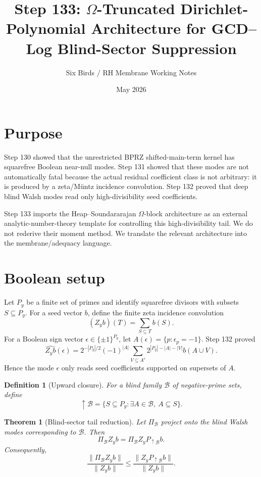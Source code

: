 \documentclass[11pt]{article}
\title{Step 133: $\Omega$-Truncated Dirichlet-Polynomial Architecture for GCD--Log Blind-Sector Suppression}
\author{Six Birds / RH Membrane Working Notes}
\date{May 2026}
\newtheorem{theorem}{Theorem}
\newtheorem{definition}{Definition}
\begin{document}
\maketitle

\section{Purpose}
Step 130 showed that the unrestricted BPRZ shifted-main-term kernel has squarefree Boolean near-null modes. Step 131 showed that these modes are not automatically fatal because the actual residual coefficient class is not arbitrary: it is produced by a zeta/Müntz incidence convolution. Step 132 proved that deep blind Walsh modes read only high-divisibility seed coefficients.

Step 133 imports the Heap--Soundararajan $\Omega$-block architecture as an external analytic-number-theory template for controlling this high-divisibility tail. We do not rederive their moment method. We translate the relevant architecture into the membrane/adequacy language.

\section{Boolean setup}
Let $P_y$ be a finite set of primes and identify squarefree divisors with subsets $S\subseteq P_y$. For a seed vector $b$, define the finite zeta incidence convolution
\[
  (Z_y b)(T)=\sum_{S\subseteq T} b(S).
\]
For a Boolean sign vector $\epsilon\in\{\pm1\}^{P_y}$, let $A(\epsilon)=\{p:\epsilon_p=-1\}$. Step 132 proved
\[
  \widehat{Z_y b}(\epsilon)
  =2^{-|P_y|/2}(-1)^{|A|}\sum_{V\subseteq A^c}2^{|P_y|-|A|-|V|}b(A\cup V).
\]
Hence the mode $\epsilon$ only reads seed coefficients supported on supersets of $A$.

\begin{definition}[Upward closure]
For a blind family $\mathcal B$ of negative-prime sets, define
\[
  \uparrow\mathcal B=
  \{S\subseteq P_y:\exists A\in\mathcal B,\ A\subseteq S\}.
\]
\end{definition}

\begin{theorem}[Blind-sector tail reduction]
Let $\Pi_{\mathcal B}$ project onto the blind Walsh modes corresponding to $\mathcal B$. Then
\[
  \Pi_{\mathcal B}Z_yb
  =\Pi_{\mathcal B}Z_yP_{\uparrow\mathcal B}b.
\]
Consequently,
\[
  \frac{\|\Pi_{\mathcal B}Z_yb\|}{\|Z_yb\|}
  \le
  \frac{\|Z_yP_{\uparrow\mathcal B}b\|}{\|Z_yb\|}.
\]
\end{theorem}
\end{document}
